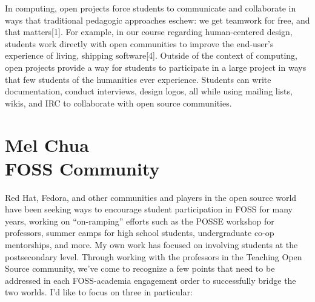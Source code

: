 \documentclass{sig-alternate}
\begin{document}
In computing, open projects force students to communicate and collaborate in ways that traditional pedagogic approaches eschew: we get teamwork for free, and that matters[1]. %
For example, in our course regarding human-centered design, students work directly with open communities to improve the end-user's experience of living, shipping software[4]. %
Outside of the context of computing, open projects provide a way for students to participate in a large project in ways that few students of the humanities ever experience. %
Students can write documentation, conduct interviews, design logos, all while using mailing lists, wikis, and IRC to collaborate with %
open source communities. %


\begin{comment}
* [1] [[BegelBibTexChooseOne|Begel BibTeX]]
* [2] http://rockalypse.org/blogs/flyinggator/
* [3] http://concurrency.cc/book/
* [4] http://rockalypse.org/courses/cmpsc303f10/
* [5] http://fedoraproject.org/wiki/Allegheny_Activism_And_Fedora
* [6] http://rockalypse.org/courses/fs101f10/
* [7] [[LPPBibTeX|Lave & Wenger BibTeX]]
\end{comment}

\section{Mel Chua\\FOSS Community}

Red Hat, Fedora, and other communities and players in the open source world have been seeking ways to encourage student participation in FOSS for many years, working on ``on-ramping'' efforts such as the POSSE workshop for professors, summer camps for high school students, undergraduate co-op mentorships, and more. My own work has focused on involving students at the postsecondary level.  Through working with the professors in the Teaching Open Source community, we've come to recognize a few points that need to be addressed in each FOSS-academia engagement order to successfully bridge the two worlds. I'd like to focus on three in particular:
\end{document}
